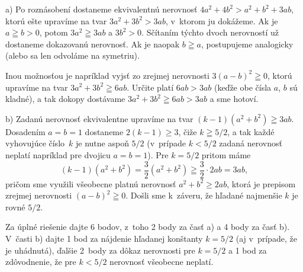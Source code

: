{%
a) Po roznásobení dostaneme ekvivalentnú nerovnosť
$4a^2+4b^2>a^2+b^2+3ab$, ktorú ešte upravíme na tvar
$3a^2+3b^2>3ab$, v~ktorom ju dokážeme.
Ak je $a\geqq b>0$, potom $3a^2\geqq 3ab$ a
$3b^2>0$. Sčítaním týchto dvoch nerovností už dostaneme
dokazovanú nerovnosť. Ak je naopak $b\geqq a$,
postupujeme analogicky (alebo sa len odvoláme na symetriu).

Inou možnosťou je napríklad vyjsť zo zrejmej nerovnosti
$3(a-b)^2\geqq 0$, ktorú upravíme na tvar $3a^2+3b^2\geqq 6ab$.
Určite platí $6ab>3ab$ (keďže obe čísla $a$, $b$ sú kladné),
a tak dokopy dostávame $3a^2+3b^2\geqq 6ab>3ab$ a sme hotoví.

\medskip
b) Zadanú nerovnosť ekvivalentne upravíme na tvar
$(k-1)(a^2+b^2)\geqq 3ab$.
Dosadením $a=b=1$ dostaneme $2(k-1)\geq3$, čiže $k\geqq5/2$,
a tak každé vyhovujúce číslo~$k$ je nutne aspoň $5/2$
(v~prípade $k<5/2$ zadaná nerovnosť neplatí napríklad
pre dvojicu $a=b=1$).
Pre $k=5/2$ pritom máme
$$
(k-1)(a^2+b^2) = \frac32(a^2+b^2)\geqq\frac32\cdot2ab=3ab,
$$
pričom sme využili všeobecne platnú nerovnosť $a^2+b^2\geq 2ab$,
ktorá je prepisom zrejmej nerovnosti $(a-b)^2\geqq0$.
Došli sme k~záveru, že hľadané najmenšie $k$ je rovné $5/2$.


\schemaABC
Za úplné riešenie dajte 6 bodov, z~toho 2 body za časť a)
a 4 body za časť b).
%
V~časti b) dajte 1 bod za nájdenie hľadanej konštanty $k=5/2$ (aj
v~prípade, že je uhádnutá), ďalšie 2~body za dôkaz
nerovnosti pre $k=5/2$ a 1 bod za zdôvodnenie, že pre $k<5/2$
nerovnosť všeobecne neplatí.
\endschema

}

